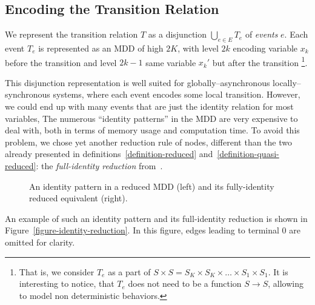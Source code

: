 \documentclass[a4paper,oneside,11pt,pdftex]{llncs}
\begin{document}
\subsection{Encoding the Transition Relation}

We represent the transition relation $T$ as a disjunction
$\bigcup_{e \in E}T_e$ of \emph{events} $e$. Each event $T_e$
is represented as an MDD of high $2K$, with level $2k$
encoding variable $x_k$ before the transition and level $2k-1$
same variable $x_k'$ but after the transition%
\footnote{That is, we consider $T_e$ as a part of
$S \times S = S_K \times S_K \times \ldots \times S_1 \times S_1$.
It is interesting to notice, that $T_e$ does not need to be a function
$S \rightarrow S$, allowing to model non deterministic behaviors.}.

This disjunction representation is well suited for
globally--asynchronous locally--synchronous systems, where
each event encodes some local transition. 
However, we could end up with many events that are just the identity relation for most variables,
The numerous ``identity patterns'' in the MDD are  %
very expensive to deal with, both in terms of memory usage
and computation time. To avoid this problem, we chose yet another reduction rule of nodes,
different than the two already presented in definitions~\vref{definition-reduced}
and~\vref{definition-quasi-reduced}: the \emph{full-identity reduction} from~\cite{Ciardo2005}.

\begin{figure}[htbp]
  \centering
    
  \caption{An identity pattern in a reduced MDD (left) and its fully-identity reduced equivalent (right).}
\label{figure-identity-reduction}
\end{figure}

An example of such an identity pattern and its full-identity
reduction is shown in Figure~\vref{figure-identity-reduction}. 
In this figure, edges leading to terminal $0$ are omitted for clarity.
\end{document}

